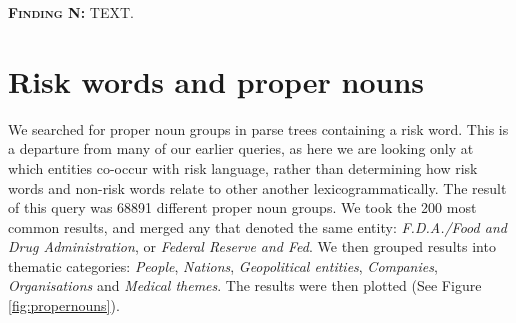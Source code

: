   \noindent\colorbox{yellow!20}{%
  \parbox{1\textwidth}{%
  \textsc{\textbf{Finding N:}} TEXT.}}

\section{Risk words and proper nouns}

    We searched for proper noun groups in parse trees containing a risk word. This is a departure from many of our earlier queries, as here we are looking only at which entities co-occur with risk language, rather than determining how risk words and non-risk words relate to other another lexicogrammatically. The result of this query was 68891 different proper noun groups. We took the 200 most common results, and merged any that denoted the same entity: \emph{F.D.A.\slash Food and Drug Administration}, or \emph{Federal Reserve and Fed}. We then grouped results into thematic categories: \emph{People}, \emph{Nations}, \emph{Geopolitical entities}, \emph{Companies}, \emph{Organisations} and \emph{Medical themes}. The results were then plotted (See Figure \ref{fig:propernouns}). 

